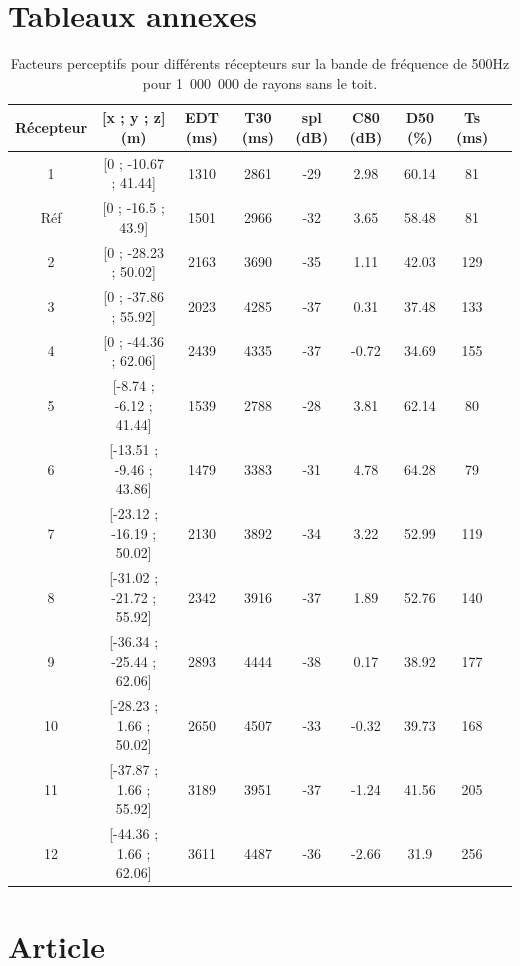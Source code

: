 \section*{Tableaux annexes}

\begin{table}[!h]
\footnotesize
 \begin{tabular}{| *{9}{c|}} 
 \hline 
 Récepteur & [x ; y ; z] (m)  & \gls{EDT} (ms) & \gls{T30} (ms) & \gls{spl} (dB) & \gls{C80} (dB) & \gls{D50} (\%) & \gls{Ts} (ms) \\ %
 \hline 
 \hline 
1  & [0 ; -10.67 ; 41.44] &1310  &2861   &-29  &2.98  &60.14  &81 \\%
 \hline 
 Réf    &[0 ; -16.5 ; 43.9] &1501  &2966   &-32  &3.65  &58.48  &81 \\%
 \hline 
 2  & [0 ; -28.23 ; 50.02] &2163  &3690   &-35  &1.11  &42.03  &129 \\ %
 \hline 
 3  &  [0 ; -37.86 ; 55.92] &2023  &4285   &-37  &0.31  &37.48  &133 \\ %
 \hline 
 4  &  [0 ; -44.36 ; 62.06] &2439  &4335   &-37  &-0.72  &34.69  &155 \\%
 \hline 
 \hline
 5  &   [-8.74 ; -6.12 ; 41.44] &1539  &2788   &-28  &3.81  &62.14  &80 \\%
 \hline 
 6  &  [-13.51 ; -9.46 ; 43.86] &1479  &3383   &-31  &4.78  &64.28  &79 \\%
  \hline 
  7 &   [-23.12 ; -16.19 ; 50.02] &2130  &3892   &-34  &3.22  &52.99  &119 \\ %
 \hline 
 8  &  [-31.02 ; -21.72 ; 55.92] &2342  &3916   &-37  &1.89  &52.76  &140 \\ %
 \hline 
 9  & [-36.34 ; -25.44 ; 62.06] &2893  &4444   &-38  &0.17  &38.92  &177 \\ %
 \hline 
 \hline
 10  &  [-28.23 ; 1.66 ; 50.02] &2650  &4507   &-33  &-0.32  &39.73  &168 \\ %
 \hline 
11   & [-37.87 ; 1.66 ; 55.92] &3189  & 3951  &-37  & -1.24 &41.56  &205 \\%
 \hline 
12   & [-44.36 ; 1.66 ; 62.06] &3611  & 4487  & -36 &-2.66  &31.9  & 256\\ %
 \hline 
\end{tabular} 
 \caption{Facteurs perceptifs pour différents récepteurs sur la bande de fréquence de 500Hz pour 1~000~000 de rayons sans le toit.} 
 \label{tab_fac_listener_sansToit} 
 \end{table}
 
\section*{Article}


 
 